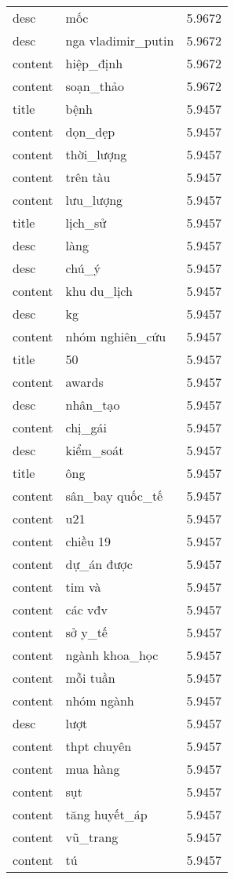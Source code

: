 \documentclass{article}
\begin{document}
\begin{tabular}{lll}
desc & mốc & 5.9672\\
desc & nga vladimir\_putin & 5.9672\\
content & hiệp\_định & 5.9672\\
content & soạn\_thảo & 5.9672\\
title & bệnh & 5.9457\\
content & dọn\_dẹp & 5.9457\\
content & thời\_lượng & 5.9457\\
content & trên tàu & 5.9457\\
content & lưu\_lượng & 5.9457\\
title & lịch\_sử & 5.9457\\
desc & làng & 5.9457\\
desc & chú\_ý & 5.9457\\
content & khu du\_lịch & 5.9457\\
desc & kg & 5.9457\\
content & nhóm nghiên\_cứu & 5.9457\\
title & 50 & 5.9457\\
content & awards & 5.9457\\
desc & nhân\_tạo & 5.9457\\
content & chị\_gái & 5.9457\\
desc & kiểm\_soát & 5.9457\\
title & ông & 5.9457\\
content & sân\_bay quốc\_tế & 5.9457\\
content & u21 & 5.9457\\
content & chiều 19 & 5.9457\\
content & dự\_án được & 5.9457\\
content & tim và & 5.9457\\
content & các vđv & 5.9457\\
content & sở y\_tế & 5.9457\\
content & ngành khoa\_học & 5.9457\\
content & mỗi tuần & 5.9457\\
content & nhóm ngành & 5.9457\\
desc & lượt & 5.9457\\
content & thpt chuyên & 5.9457\\
content & mua hàng & 5.9457\\
content & sụt & 5.9457\\
content & tăng huyết\_áp & 5.9457\\
content & vũ\_trang & 5.9457\\
content & tú & 5.9457\\

\end{tabular}
\end{document}
